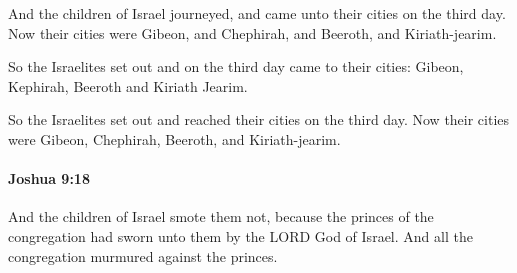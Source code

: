 			\begin{versebox}
					\item[BHS] 
					\item[ASV] And the children of Israel journeyed, and came unto their cities on the third day. Now their cities were Gibeon, and Chephirah, and Beeroth, and Kiriath-jearim.
					\item[NIV] So the Israelites set out and on the third day came to their cities: Gibeon, Kephirah, Beeroth and Kiriath Jearim.
					\item[NRSV] So the Israelites set out and reached their cities on the third day. Now their cities were Gibeon, Chephirah, Beeroth, and Kiriath-jearim.
			\end{versebox}

		\paragraph{Joshua 9:18} %
			\label{JOSHUA-9-18}

			And the children of Israel smote them not, because the princes of the congregation had sworn unto them by the LORD God of Israel. And all the congregation murmured against the princes.

